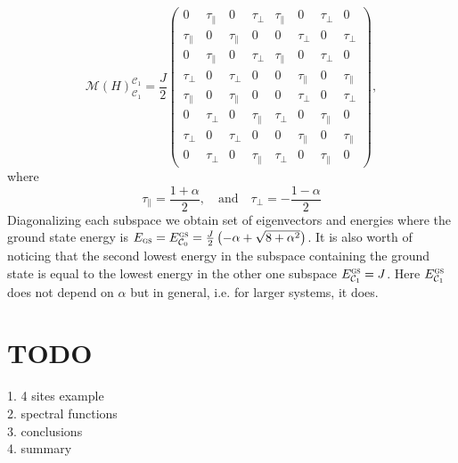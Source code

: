 \documentclass[12pt, a4paper]{article}
\begin{document}
\begin{equation}
\mathcal{M}(H)_{\mathcal{C}_1}^{\mathcal{C}_1} = \frac{J}{2} \begin{pmatrix}
0 & \tau_{\parallel} & 0 & \tau_{\perp} & \tau_{\parallel} & 0 & \tau_{\perp} & 0 \\
\tau_{\parallel} & 0 & \tau_{\parallel} & 0 & 0 & \tau_{\perp}  & 0 & \tau_{\perp}\\
0 & \tau_{\parallel}  & 0 & \tau_{\perp} & \tau_{\parallel}  & 0 & \tau_{\perp}  & 0 \\
\tau_{\perp}& 0 & \tau_{\perp} & 0 & 0 & \tau_{\parallel}  & 0 & \tau_{\parallel} \\
\tau_{\parallel}& 0 & \tau_{\parallel} & 0 & 0 & \tau_{\perp}  & 0 & \tau_{\perp} \\
0 & \tau_{\perp}  & 0 & \tau_{\parallel} & \tau_{\perp}  & 0 & \tau_{\parallel}  & 0 \\
\tau_{\perp} & 0 & \tau_{\perp} & 0 & 0 & \tau_{\parallel}  & 0 & \tau_{\parallel}\\
0 & \tau_{\perp} & 0 & \tau_{\parallel} & \tau_{\perp} & 0 & \tau_{\parallel} & 0
\end{pmatrix},
\end{equation}
where
\begin{equation}
\tau_{\parallel} = \frac{1+\alpha}{2}, \quad \text{and} \quad \tau_{\perp} = -\frac{1-\alpha}{2}
\end{equation}
Diagonalizing each subspace we obtain set of eigenvectors and energies where the ground state energy is $E_\textsc{gs} = E^\textsc{gs}_{\mathcal{C}_0} = \frac{J}{2}\left(-\alpha + \sqrt{8 + \alpha^2}\right)$. It is also worth of noticing that the second lowest energy in the subspace containing the ground state is equal to the lowest energy in the other one subspace $E^{\textsc{gs}}_{\mathcal{C}_1} = J$. Here $E^{\textsc{gs}}_{\mathcal{C}_1}$ does not depend on $\alpha$ but in general, i.e. for larger systems, it does.

\section{TODO}
1. 4 sites example \\
2. spectral functions \\
3. conclusions \\
4. summary
\end{document}
